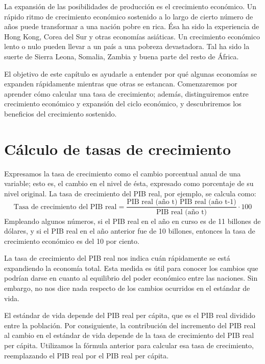 \documentclass[
]{krantz}
\begin{document}
La expansión de las posibilidades de producción es el crecimiento económico. Un rápido ritmo de crecimiento económico sostenido a lo largo de cierto número de años puede transformar a una nación pobre en rica. Ésa ha sido la experiencia de Hong Kong, Corea del Sur y otras economías asiáticas. Un crecimiento económico lento o nulo pueden llevar a un país a una pobreza devastadora. Tal ha sido la suerte de Sierra Leona, Somalia, Zambia y buena parte del resto de África.

El objetivo de este capítulo es ayudarle a entender por qué algunas economías se expanden rápidamente mientras que otras se estancan. Comenzaremos por aprender cómo calcular una tasa de crecimiento; además, distinguiremos entre crecimiento económico y expansión del ciclo económico, y descubriremos los beneficios del crecimiento sostenido.

\hypertarget{cuxe1lculo-de-tasas-de-crecimiento}{%
\section{Cálculo de tasas de crecimiento}\label{cuxe1lculo-de-tasas-de-crecimiento}}

Expresamos la tasa de crecimiento como el cambio porcentual anual de una variable; esto es, el cambio en el nivel de ésta, expresado como porcentaje de su nivel original. La tasa de crecimiento del PIB real, por ejemplo, se calcula como:
\[\mathrm {\text{Tasa de crecimiento del PIB real} = \frac{\text{PIB real (año t) PIB real (año t-1)}}{\text{PIB real (año t)}}·100}\]
Empleando algunos números, si el PIB real en el año en curso es de 11 billones de dólares, y si el PIB real en el año anterior fue de 10 billones, entonces la tasa de crecimiento económico es del 10 por ciento.

La tasa de crecimiento del PIB real nos indica cuán rápidamente se está expandiendo la economía total. Esta medida es útil para conocer los cambios que podrían darse en cuanto al equilibrio del poder económico entre las naciones. Sin embargo, no nos dice nada respecto de los cambios ocurridos en el estándar de vida.

El estándar de vida depende del PIB real per cápita, que es el PIB real dividido entre la población. Por consiguiente, la contribución del incremento del PIB real al cambio en el estándar de vida depende de la tasa de crecimiento del PIB real per cápita. Utilizamos la fórmula anterior para calcular esa tasa de crecimiento, reemplazando el PIB real por el PIB real per cápita.
\end{document}

